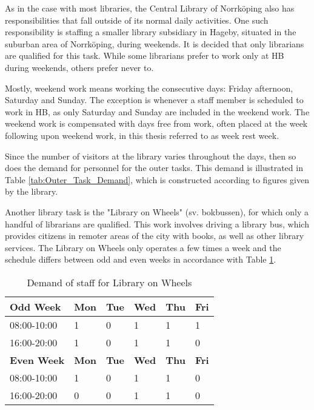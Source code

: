As in the case with most libraries, the Central Library of Norrköping also has responsibilities that fall outside of its normal daily activities. One such responsibility is staffing a smaller library subsidiary in Hageby, situated in the suburban area of Norrköping, during weekends. It is decided that only librarians are qualified for this task. While some librarians prefer to work only at HB during weekends, others prefer never to.

Mostly, weekend work means working the consecutive days: Friday afternoon, Saturday and Sunday. The exception is whenever a staff member is scheduled to work in HB, as only Saturday and Sunday are included in the weekend work. The weekend work is compensated with days free from work, often placed at the week following upon weekend work, in this thesis referred to as week rest week.


Since the number of visitors at the library varies throughout the days, then so does the demand for personnel for the outer tasks. This demand is illustrated in Table \ref{tab:Outer_Task_Demand}, which is constructed according to figures given by the library. 

Another library task is the "Library on Wheels" (sv. bokbussen), for which only a handful of librarians are qualified. This work involves driving a library bus, which provides citizens in remoter areas of the city with books, as well as other library services. The Library on Wheels only operates a few times a week and the schedule differs between odd and even weeks in accordance with Table \ref{tab:LOW_Demand}.

\begin{table}[ht]
\centering
\caption{Demand of staff for Library on Wheels}
\label{tab:LOW_Demand}
\begin{tabularx}{0.80\textwidth}{|l|X|X|X|X|X|}
\hline
 \textbf{Odd Week} & \textbf{Mon} & \textbf{Tue} & \textbf{Wed} & \textbf{Thu} & \textbf{Fri} 
 \\ \hline 
\rowcolor{Gray} 
08:00-10:00 & 1 & 0 & 1 & 1 & 1 
\\ \hline 
\rowcolor{Gray} 
16:00-20:00 & 1 & 0 & 1 & 1 & 0 
\\ \hline 
 \textbf{Even Week} & \textbf{Mon} & \textbf{Tue} & \textbf{Wed} & \textbf{Thu} & \textbf{Fri} 
 \\ \hline 
\rowcolor{Gray} 
08:00-10:00 & 1 & 0 & 1 & 1 & 0 
\\ \hline 
\rowcolor{Gray} 
16:00-20:00 & 0 & 0 & 1 & 1 & 0 
\\ \hline 
\end{tabularx}
\end{table}


